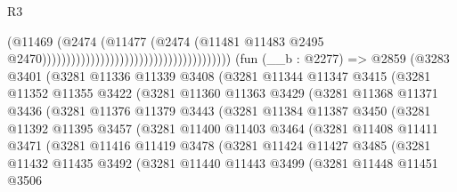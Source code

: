 \begin{lexlean}{R3}
\begin{coremodule}
                                                                        (@11469
                                                                          (@2474
                                                                            (@11477
                                                                              (@2474
                                                                                (@11481
                                                                                  @11483
                                                                                  @2495
                                                                                  @2470)))))))))))))))))))))))))))))))))))))))
    (fun (__b : @2277) =>
    @2859
      (@3283
        @3401
        (@3281
          @11336
          @11339
          @3408
          (@3281
            @11344
            @11347
            @3415
            (@3281
              @11352
              @11355
              @3422
              (@3281
                @11360
                @11363
                @3429
                (@3281
                  @11368
                  @11371
                  @3436
                  (@3281
                    @11376
                    @11379
                    @3443
                    (@3281
                      @11384
                      @11387
                      @3450
                      (@3281
                        @11392
                        @11395
                        @3457
                        (@3281
                          @11400
                          @11403
                          @3464
                          (@3281
                            @11408
                            @11411
                            @3471
                            (@3281
                              @11416
                              @11419
                              @3478
                              (@3281
                                @11424
                                @11427
                                @3485
                                (@3281
                                  @11432
                                  @11435
                                  @3492
                                  (@3281
                                    @11440
                                    @11443
                                    @3499
                                    (@3281
                                      @11448
                                      @11451
                                      @3506

\end{coremodule}
\end{lexlean}
